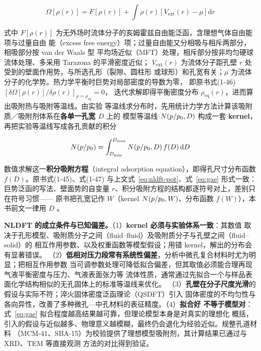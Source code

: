 \begin{equation}\label{eq:nldft-pot}
\Omega\!\left[\rho(r)\right]=F\!\left[\rho(r)\right]
+\int\!\rho(r)\left[V_{\mathrm{ext}}(r)-\mu\right]\mathrm{d}r
\end{equation}

式中 $F[\rho(r)]$ 为无外场时流体分子的亥姆霍兹自由能泛函，含理想气体自由能项与过量自由
能（excess free energy）项；过量自由能又分相吸与相斥两部分，相吸部分按 van der Waals 型
平均场近似（MFT）处理，相斥部分按非均匀硬球流体处理、多采用 Tarazona 的平滑密度近似；
$V_{\mathrm{ext}}(r)$ 为流体分子距孔壁 $r$ 处受到的壁面作用势，与所选孔形（裂隙、圆柱形
或球形）和孔宽有关；$\mu$ 为流体分子的化学势。热力学平衡时巨势对局部密度的导数为零，
即原书式(1-46)
$\left[\delta\Omega[\rho(r)]/\delta\rho(r)\right]_{\rho=\rho_{\mathrm{eq}}}=0$，
迭代求解即得平衡密度分布 $\rho_{\mathrm{eq}}(r)$，进而算出吸附热与吸附等温线。由实验
等温线求分布时，先用统计力学方法计算该吸附质／吸附剂体系在\textbf{各单一孔宽 $D$} 上的
模型等温线 $N(p/p_{0},D)$ 构成一套 \textbf{kernel}，再把实验等温线写成各孔贡献的积分

\begin{equation}\label{eq:gae}
N\!\left(p/p_{0}\right)=\int_{D_{\min}}^{D_{\max}}
N\!\left(p/p_{0},D\right)f(D)\,\mathrm{d}D
\end{equation}

数值求解这一\textbf{积分吸附方程}（integral adsorption equation），即得孔尺寸分布函数
$f(D)$。原书式(1-45)、式(1-47) 与上文式~\eqref{eq:nldft-pot}、式~\eqref{eq:gae} 形式一致：
巨势泛函的写法、壁面势的自变量 $r$、积分吸附方程的结构都逐符号对上，差别只在符号习惯——
原书把孔宽记作 $W$（kernel $N(p/p_{0},W)$、分布函数 $f(W)$），本书前文一律用 $D$
。

\begin{keycond}
\textbf{NLDFT 的成立条件与已知偏差。}（1）\textbf{kernel 必须与实验体系一致}：其数值
取决于孔形模型、吸附质分子之间（fluid--fluid）及吸附质分子与孔壁之间（fluid--solid）的
相互作用参数、以及权重函数等模型假设；用错 kernel，解出的分布会有显著错误。
（2）\textbf{低相对压力段常有系统性偏差}，分析中微孔复合材料时尤为明显；把相互作用参数
当可调参数处理可降低拟合偏差，但其取值必须能合理再现气液平衡密度与压力、气液表面张力等
流体性质，通常通过先拟合一个与样品表面化学结构相似的无孔固体上的标准等温线来优化。
（3）\textbf{孔壁在分子尺度光滑}的假设与实际不符；淬火固体密度泛函理论（QSDFT）引入
固体密度的不均匀性与各向异性，改善了多种微孔—中孔材料的表征精度。（4）\textbf{拟合好
不等于模型对}：式~\eqref{eq:gae} 拟合程度越高结果越可靠，但理论模型本身是对真实的理想化
概括，引入的假设与近似越多、物理意义越模糊，最终仍会退化为经验近似。规整孔道材料
（MCM-41、SBA-15）为校验提供了理想模型吸附剂，其计算结果已通过与 XRD、TEM 等直接观测
方法的对比得到验证。
\end{keycond}

